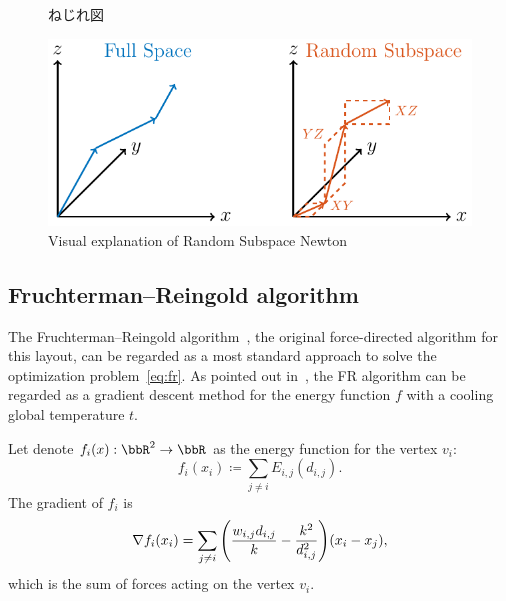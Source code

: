\documentclass[dvipdfmx,journal]{IEEEtran}
\newcommand{\defeq}{\coloneqq}
\begin{document}
\begin{figure}[t]
  \begin{minipage}{0.49\hsize}
    \centering
    \caption{
      ねじれ図
    }
  \end{minipage}
  \begin{minipage}{0.49\hsize}
    \centering
    \includegraphics[width=\columnwidth]{randomSubspace.pdf}
    \caption{
      Visual explanation of
      Random Subspace Newton
    }
  \end{minipage}
\end{figure}

\subsection{Fruchterman--Reingold algorithm}\label{ssec:frAlgorithm}

The Fruchterman--Reingold algorithm~\cite{fruchtermanGraphDrawingForcedirected1991}, the original force-directed algorithm for this layout, can be regarded as a most standard approach to solve the optimization problem~\eqref{eq:fr}.
As pointed out in~\cite{tunkelang1999numerical}, the FR algorithm can be regarded as a gradient descent method for the energy function $f$ with a cooling global temperature $t$.

Let denote $f_i(x): \bbR^2 \to \bbR$ as the energy function for the vertex $v_i$:
\begin{equation*}
  f_i(x_i) \defeq \sum_{j \neq i} E_{i,j}(d_{i,j}).
\end{equation*}
The gradient of $f_i$ is
\begin{equation}\label{eq:gradientFi}
  \nabla f_i(x_i) = \sum_{j \neq i} \qty(\frac{w_{i,j}d_{i,j}}{k} - \frac{k^2}{d_{i,j}^2}) (x_i-x_j),
\end{equation}
which is the sum of forces acting on the vertex $v_i$.
\end{document}
